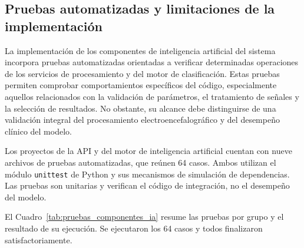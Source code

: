 \subsection[Pruebas automatizadas y limitaciones de la implementación]{Pruebas automatizadas y limitaciones de la \\implementación}

La implementación de los componentes de inteligencia artificial del sistema incorpora pruebas automatizadas orientadas a verificar
determinadas operaciones de los servicios de procesamiento y del motor
de clasificación. Estas pruebas permiten comprobar comportamientos
específicos del código, especialmente aquellos relacionados con la
validación de parámetros, el tratamiento de señales y la selección
de resultados. No obstante, su alcance debe distinguirse de una
validación integral del procesamiento electroencefalográfico y del
desempeño clínico del modelo.

Los proyectos de la API y del motor de inteligencia artificial cuentan con nueve archivos de pruebas automatizadas, que reúnen 64 casos.
Ambos utilizan el módulo \texttt{unittest} de Python y sus mecanismos de simulación de dependencias.
Las pruebas son unitarias y verifican el código de integración, no el desempeño del modelo.

El Cuadro~\ref{tab:pruebas_componentes_ia} resume las pruebas por grupo y el resultado de su ejecución.
Se ejecutaron los 64 casos y todos finalizaron satisfactoriamente.

